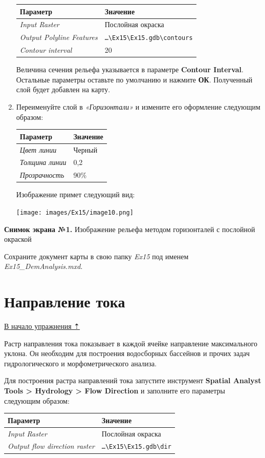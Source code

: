 \documentclass[12pt,]{book}
\begin{document}
\begin{enumerate}
  \begin{longtable}[]{@{}ll@{}}
  \toprule
  Параметр & Значение\tabularnewline
  \midrule
  \endhead
  \emph{Input Raster} & Послойная окраска\tabularnewline
  \emph{Output Polyline Features} & \texttt{\ldots{}\textbackslash{}Ex15\textbackslash{}Ex15.gdb\textbackslash{}contours}\tabularnewline
  \emph{Contour interval} & 20\tabularnewline
  \bottomrule
  \end{longtable}

  Величина сечения рельефа указывается в параметре \textbf{Contour Interval}. Остальные параметры оставьте по умолчанию и нажмите \textbf{ОК}. Полученный слой будет добавлен на карту.
\item
  Переименуйте слой в \emph{«Горизонтали»} и измените его оформление следующим образом:

  \begin{longtable}[]{@{}ll@{}}
  \toprule
  Параметр & Значение\tabularnewline
  \midrule
  \endhead
  \emph{Цвет линии} & Черный\tabularnewline
  \emph{Толщина линии} & 0,2\tabularnewline
  \emph{Прозрачность} & 90\%\tabularnewline
  \bottomrule
  \end{longtable}

  Изображение примет следующий вид:

  \texttt{[image: images/Ex15/image10.png]}
\end{enumerate}

\textbf{Снимок экрана №1.} Изображение рельефа методом горизонталей с послойной окраской

Сохраните документ карты в свою папку \emph{Ex15} под именем \emph{Ex15\_DemAnalysis.mxd}.

\hypertarget{dem-flowdir}{%
\section{Направление тока}\label{dem-flowdir}}

\protect\hyperlink{dem}{В начало упражнения ⇡}

Растр направления тока показывает в каждой ячейке направление максимального уклона. Он необходим для построения водосборных бассейнов и прочих задач гидрологического и морфометрического анализа.

Для построения растра направлений тока запустите инструмент \textbf{Spatial Analyst Tools \textgreater{} Hydrology \textgreater{} Flow Direction} и заполните его параметры следующим образом:

\begin{longtable}[]{@{}ll@{}}
\toprule
Параметр & Значение\tabularnewline
\midrule
\endhead
\emph{Input Raster} & Послойная окраска\tabularnewline
\emph{Output flow direction raster} & \texttt{\ldots{}\textbackslash{}Ex15\textbackslash{}Ex15.gdb\textbackslash{}dir}\tabularnewline
\bottomrule
\end{longtable}
\end{document}

